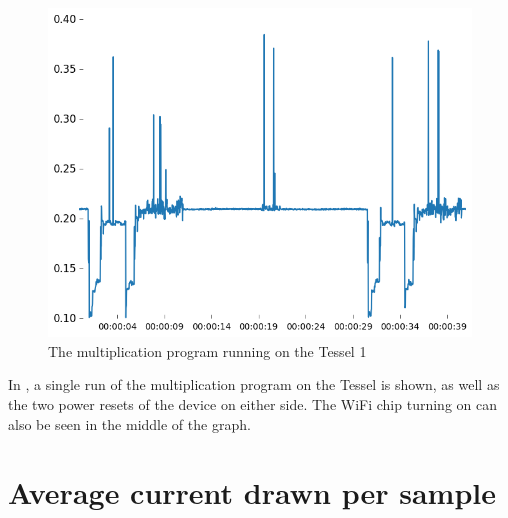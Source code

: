 \clearpage

\begin{figure}[h!]
\centering
\includegraphics[scale=0.6]{fig/graphs/tessel_multi.png}
\caption{The multiplication program running on the Tessel 1}
\label{fig:multtes}
\end{figure}
In , a single run of the multiplication program on the Tessel is shown, as well as the two power resets of the device on either side.
The WiFi chip turning on can also be seen in the middle of the graph.


\section{Average current drawn per sample}
\label{sec:avgcurrent}



